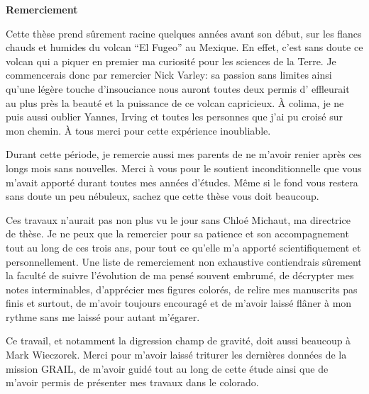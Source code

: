 \thispagestyle{plain}
\begin{flushleft}
  \Large
  \vspace{.5cm}
  \textbf{Remerciement}
\end{flushleft}

Cette thèse prend sûrement racine quelques années avant son début, sur
les flancs  chauds et humides  du volcan  ``El Fugeo'' au  Mexique. En
effet, c'est sans doute ce volcan qui a piquer en premier ma curiosité
pour les sciences de la Terre. Je commencerais donc par remercier Nick
Varley:   sa  passion   sans  limites   ainsi  qu'une   légère  touche
d'insouciance nous  auront toutes  deux permis  d’ effleurait  au plus
près la beauté  et la puissance de ce volcan  capricieux. À colima, je
ne puis aussi oublier Yannes, Irving  et toutes les personnes que j'ai
pu  croisé  sur  mon  chemin.  À  tous  merci  pour  cette  expérience
inoubliable.

Durant  cette période,  je remercie  aussi mes  parents de  ne m'avoir
renier  après ces  longs mois  sans nouvelles.  Merci à  vous pour  le
soutient inconditionnelle  que vous m'avait apporté  durant toutes mes
années  d'études. Même  si  le fond  vous restera  sans  doute un  peu
nébuleux, sachez que cette thèse vous doit beaucoup.

Ces travaux  n'aurait pas non plus  vu le jour sans  Chloé Michaut, ma
directrice de thèse.  Je ne peux  que la remercier pour sa patience et
son accompagnement tout au long de ces trois ans, pour tout ce qu'elle
m'a  apporté  scientifiquement  et   personnellement.   Une  liste  de
remerciement non exhaustive contiendrais sûrement la faculté de suivre
l'évolution  de  ma pensé  souvent  embrumé,  de décrypter  mes  notes
interminables,  d'apprécier   mes  figures  colorés,  de   relire  mes
manuscrits pas finis  et surtout, de m'avoir toujours  encouragé et de
m'avoir  laissé  flâner  à  mon  rythme sans  me  laissé  pour  autant
m'égarer.

Ce travail,  et notamment la  digression champ de gravité,  doit aussi
beaucoup à  Mark Wieczorek.   Merci pour  m'avoir laissé  triturer les
dernières données de  la mission GRAIL, de m'avoir guidé  tout au long
de cette  étude ainsi que de  m'avoir permis de présenter  mes travaux
dans le colorado.











\vspace{2cm}

